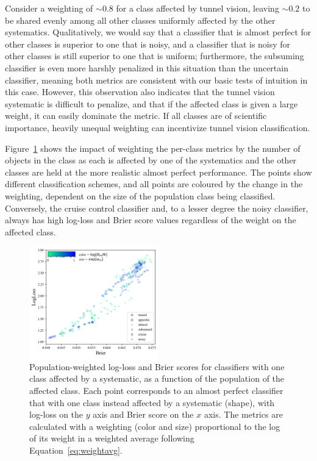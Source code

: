 Consider a weighting of $\sim0.8$ for a class affected by tunnel vision, leaving $\sim0.2$ to be shared evenly among all other classes uniformly affected by the other systematics.
Qualitatively, we would say that a classifier that is almost perfect for other classes is superior to one that is noisy, and a classifier that is noisy for other classes is still superior to one that is uniform; furthermore, the subsuming classifier is even more harshly penalized in this situation than the uncertain classifier, meaning both metrics are  consistent with our basic tests of intuition in this case.
However, this observation also indicates that the tunnel vision systematic is difficult to penalize, and that if the affected class is given a large weight, it can easily dominate the metric.
If all classes are of scientific importance, heavily unequal weighting can incentivize tunnel vision classification.

Figure~\ref{fig:popweight} shows the impact of weighting the per-class metrics by the number of objects in the class as each is affected by one of the systematics and the other classes are held at the more realistic almost perfect performance.
The points show different classification schemes, and all points are coloured by the change in the weighting, dependent on the size of the population class being classified.
Conversely, the cruise control classifier and, to a lesser degree the noisy classifier, always has high log-loss and Brier score values regardless of the weight on the affected class.

\begin{figure}
	\begin{center}
		\includegraphics[width=0.5\textwidth]{./fig/all_effects_isolated.png}
		\caption{Population-weighted log-loss and Brier scores for classifiers with one class affected by a systematic, as a function of the population of the affected class.
		Each point corresponds to an almost perfect classifier that with one class instead affected by a systematic (shape), with log-loss on the $y$ axis and Brier score on the $x$ axis.
		The metrics are calculated with a weighting (color and size) proportional to the log of its weight in a weighted average following Equation~\ref{eq:weightavg}.
		}
	\end{center}
	\label{fig:popweight}
\end{figure}

